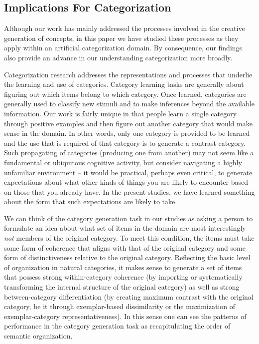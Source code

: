 \documentclass[12pt]{article}
\begin{document}
\begin{flushleft}
\subsection{Implications For Categorization}

Although our work has mainly addressed the processes involved in the creative
generation of concepts, in this paper we have studied these processes as they
apply within an artificial categorization domain. By consequence, our findings
also provide an advance in our understanding categorization more broadly.

Categorization research addresses the representations and processes that
underlie the learning and use of categories. Category learning tasks are
generally about figuring out which items belong to which category. Once learned,
categories are generally used to classify new stimuli and to make inferences
beyond the available information. Our work is fairly unique in that people learn
a single category through positive examples and then figure out another category
that would make sense in the domain. In other words, only one category is
provided to be learned and the use that is required of that category is to
generate a contrast category. Such propagating of categories (producing one from
another) may not seem like a fundamental or ubiquitous cognitive activity, but
consider navigating a highly unfamiliar environment -- it would be practical,
perhaps even critical, to generate expectations about what other kinds of things
you are likely to encounter based on those that you already have. In the present
studies, we have learned something about the form that such expectations are
likely to take.

We can think of the category generation task in our studies as asking a person
to formulate an idea about what set of items in the domain are most
interestingly {\em not} members of the original category. To meet this
condition, the items must take some form of coherence that aligns with that of
the original category and some form of distinctiveness relative to the original
category. Reflecting the basic level of organization in natural categories, it
makes sense to generate a set of items that possess strong within-category
coherence (by importing or systematically transforming the internal structure of
the original category) as well as strong between-category differentiation (by
creating maximum contrast with the original category, be it through
exemplar-based dissimilarity or the maximization of exemplar-category
representativeness). In this sense one can see the patterns of performance in
the category generation task as recapitulating the order of semantic
organization.


\end{flushleft}
\end{document}
